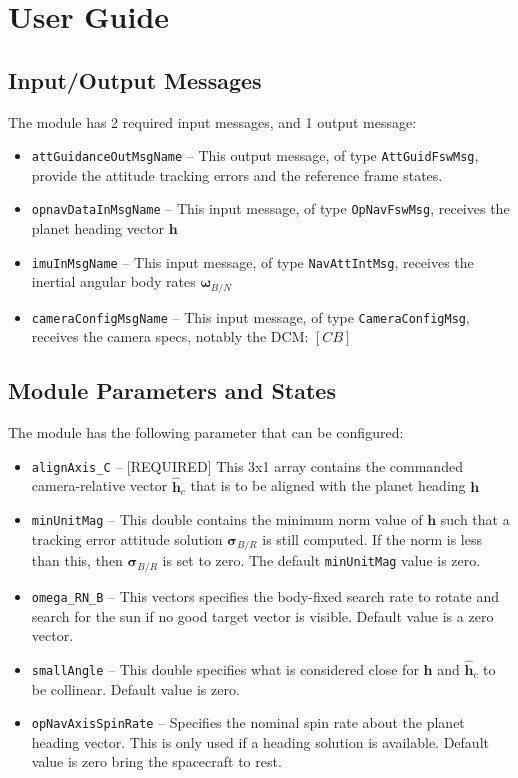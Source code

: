 
\section{User Guide}
\subsection{Input/Output Messages}
The module has 2 required input messages, and 1 output message:
\begin{itemize}
	\item {\tt attGuidanceOutMsgName} -- This output message, of type {\tt AttGuidFswMsg}, provide the attitude tracking errors and the reference frame states.
	\item {\tt opnavDataInMsgName} -- This input message, of type {\tt OpNavFswMsg}, receives the planet heading vector $\bm h$
	\item {\tt imuInMsgName} -- This input message, of type {\tt NavAttIntMsg}, receives the inertial angular body rates $\bm \omega_{B/N}$
	\item {\tt cameraConfigMsgName} -- This input message, of type {\tt CameraConfigMsg}, receives the camera specs, notably the DCM: $[CB]$
\end{itemize}

\subsection{Module Parameters and States}
The module has the following parameter that can be configured:
\begin{itemize}
	\item {\tt alignAxis\_C} -- [REQUIRED] This 3x1 array contains the commanded camera-relative vector $\hat{\bm h}_{c}$ that is to be aligned with the planet heading $\bm h$
	
	\item {\tt minUnitMag} -- This double contains the minimum norm value of $\bm h$ such that a tracking error attitude solution $\bm\sigma_{B/R}$ is still computed.  If the norm is less than this, then $\bm\sigma_{B/R}$ is set to zero.  The default {\tt minUnitMag} value is zero. 
	
	\item {\tt omega\_RN\_B} -- This vectors specifies the body-fixed search rate to rotate and search for the sun if no good target vector is visible.  Default value is a zero vector.  

	\item {\tt smallAngle} -- This double specifies what is considered close for $\bm h$ and $\hat{\bm h}_{c}$ to be collinear.  Default value is zero.  
	
	\item {\tt opNavAxisSpinRate} -- Specifies the nominal spin rate about the planet heading vector.  This is only used if a heading solution is available.  Default value is zero bring the spacecraft to rest. 
	
\end{itemize}

